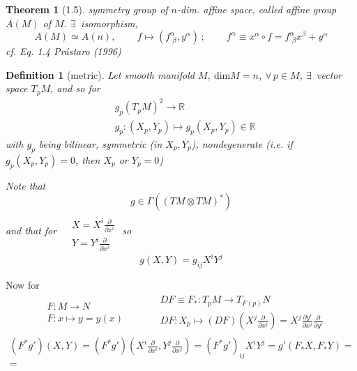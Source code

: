 \documentclass[10pt]{amsart}
\newtheorem{theorem}{Theorem}
\newtheorem{definition}{Definition}
\begin{document}
\begin{multicols*}{2}
\begin{theorem}[1.5] symmetry group of $n$-dim. affine space, called affine group $A(M)$ of $M$.  $\exists \, $ isomorphism,
  \begin{equation}
    A(M) \simeq A(n), \qquad \, f\mapsto (f^{\alpha}_{ \, \, \beta} , y^{\alpha}) \, ; \qquad \, f^{\alpha} \equiv x^{\alpha} \circ f = f^{\alpha}_{ \, \, \beta} x^{\beta} + y^{\alpha}
  \end{equation}
cf. Eq. 1.4 Pr\'{a}staro (1996) \cite{Pras1996}
  \end{theorem}

\begin{definition}[metric]
	Let smooth manifold $M$, $\text{dim}M = n$, $\forall \, p \in M$, $\exists \, $ vector space $T_pM$, and so for 
	\begin{equation}
	\begin{aligned}
	& g_p (T_pM)^2 \to \mathbb{R} \\
	& g_p : (X_p,Y_p) \mapsto g_p(X_p,Y_p) \in \mathbb{R}
	\end{aligned}
	\end{equation}
	with $g_p$ being bilinear, symmetric (in $X_p,Y_p$), nondegenerate (i.e. if $g_p(X_p,Y_p)=0$, then $X_p$ or $Y_p=0$)
	
	Note that 
	\[
	g\in \Gamma((TM \otimes TM)^*)
	\]
	and that for $\begin{aligned} & \quad \\ 
	& X = X^i \frac{ \partial }{ \partial x^i } \\
	& Y = Y^i \frac{ \partial }{ \partial x^i } \end{aligned}$  
	so 	
	\[
	g(X,Y) = g_{ij} X^i Y^j
	\]  
	
\end{definition}

Now for 
\[
\begin{gathered}
\begin{aligned} 
& F: M \to N \\
& F: x \mapsto y = y(x) 
\end{aligned} \qquad \, \begin{aligned}
& DF \equiv F_* : T_p M \to T_{F(p)}N \\ 
&  DF : X_p \mapsto (DF) (X^j \frac{ \partial }{ \partial x^j }) = X^j \frac{\partial y^i}{\partial x^j} \frac{ \partial }{ \partial y^i}
\end{aligned}
\end{gathered}
\]
\[
\begin{gathered}
(F^* g')(X,Y) = (F^*g')(X^i \frac{ \partial }{ \partial x^i } , Y^j \frac{ \partial }{ \partial x^j} ) = (F^*g')_{ij} X^i Y^j = g'(F_*X, F_*Y) = \\
= 
\end{gathered}
\]


\end{multicols*}
\end{document}
